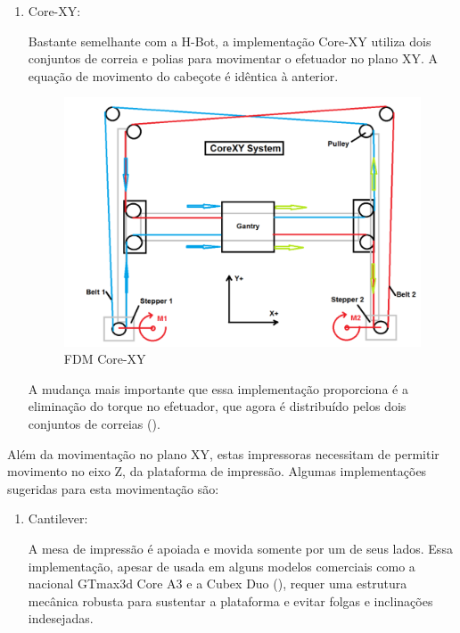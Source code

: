 \documentclass[12pt, english]{article}
\begin{document}
\begin{enumerate}[leftmargin=*, listparindent=0.7cm]
{\begin{enumerate}[leftmargin=*, listparindent=0.7cm]
{				Na qual $\Delta x$ e $\Delta y$ são variações de movimento do cabeçote, $\Delta \varphi_{1}$ e $\Delta \varphi_{2}$ são as rotações dos motores e $r$ é o raio das polias dos motores (assumindo iguais) (\cite{Sollmann2010})

				Esta implementação apresenta uma fraqueza: o movimento do efetuador é gerado por uma única correia, provocando torque indesejado na estrutura do cabeçote (\cite{Makksu2016}).
			}
			\item {
				Core-XY:
				
				Bastante semelhante com a H-Bot, a implementação Core-XY utiliza dois conjuntos de correia e polias para movimentar o efetuador no plano XY. A equação de movimento do cabeçote é idêntica à anterior. 

				\begin{figure}[H]
					\centering
					\includegraphics[height=.4\linewidth]{FDM-CoreXy.png}
					\caption{FDM Core-XY}
				\end{figure}
				
				A mudança mais importante que essa implementação proporciona é a eliminação do torque no efetuador, que agora é distribuído pelos dois conjuntos de correias (\cite{COREXY}).
				
			}
		\end{enumerate}
	}

	Além da movimentação no plano XY, estas impressoras necessitam de permitir movimento no eixo Z, da plataforma de impressão. Algumas implementações sugeridas para esta movimentação são:

	\begin{enumerate}[leftmargin=*, listparindent=0.7cm]
		\item {
			
			Cantilever: 
				
			A mesa de impressão é apoiada e movida somente por um de seus lados. Essa implementação, apesar de usada em alguns modelos comerciais como a nacional GTmax3d Core A3 e a Cubex Duo (\cite{CUBEXDUO}), requer uma estrutura mecânica robusta para sustentar a plataforma e evitar folgas e inclinações indesejadas.

}
\end{enumerate}
\end{enumerate}
\end{document}
